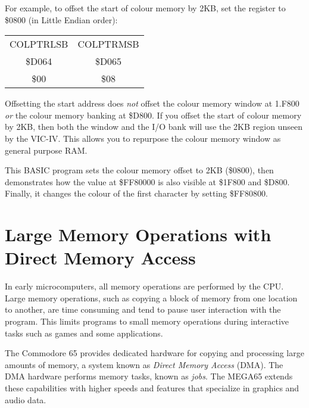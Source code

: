 For example, to offset the start of colour memory by 2KB, set the register to
\$0800 (in Little Endian order):

\begin{center}
\begin{tabular}{|c|c|}
\hline
COLPTRLSB & COLPTRMSB \\
\$D064 & \$D065 \\
\hline
\$00 & \$08 \\
\hline
\end{tabular}
\end{center}

Offsetting the start address does {\em not} offset the colour memory window at 1.F800
{\em or} the colour memory banking at \$D800. If you offset the start of colour
memory by 2KB, then both the window and the I/O bank will use the 2KB region
unseen by the VIC-IV. This allows you to repurpose the colour memory window as
general purpose RAM.

This BASIC program sets the colour memory offset to 2KB (\$0800), then
demonstrates how the value at \$FF80000 is also visible at \$1F800 and \$D800.
Finally, it changes the colour of the first character by setting \$FF80800.



\newpage
\section{Large Memory Operations with Direct Memory Access}

In early microcomputers, all memory operations are performed by the CPU. Large
memory operations, such as copying a block of memory from one location to
another, are time consuming and tend to pause user interaction with the program. This
limits programs to small memory operations during interactive tasks such as
games and some applications.

The Commodore 65 provides dedicated hardware for copying and processing large
amounts of memory, a system known as {\em Direct Memory Access} (DMA). The DMA
hardware performs memory tasks, known as {\em jobs}. The MEGA65 extends these
capabilities with higher speeds and features that specialize in
graphics and audio data.

